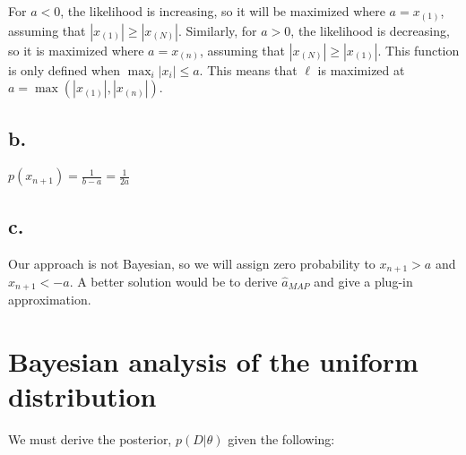 \documentclass{article}
\begin{document}
\begin{figure}[h]
\end{figure}

For $a < 0$, the likelihood is increasing, so it will be maximized
where $a = x_{(1)}$, assuming that $|x_{(1)}| \ge |x_{(N)}|$.
Similarly, for $a > 0$, the likelihood is decreasing, so it is
maximized where $a = x_{(n)}$, assuming that
$|x_{(N)}| \ge |x_{(1)}|$. This function is only defined when
$\max_i |x_i| \le a$. This means that $\ell$ is maximized at
$a = \max( |x_{(1)}|, |x_{(n)}| )$.

\subsection{b.}
$p(x_{n+1}) = \frac{1}{b-a} = \frac{1}{2a}$

\subsection{c.}
Our approach is not Bayesian, so we will assign zero probability to
$x_{n+1} > a$ and $x_{n+1} < -a$. A better solution would be to derive
$\hat{a}_{MAP}$ and give a plug-in approximation.

\section{Bayesian analysis of the uniform distribution}

We must derive the posterior, $p(D|\theta)$ given the following:
\end{document}
